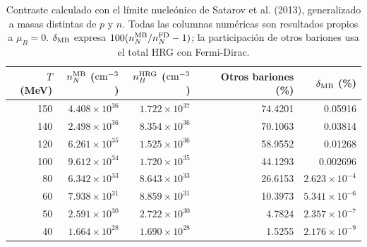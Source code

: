 \begin{table}[t]\centering\small
\caption{Contraste calculado con el límite nucleónico de Satarov et al. (2013), generalizado a masas distintas de $p$ y $n$. Todas las columnas numéricas son resultados propios a $\mu_B=0$. $\delta_{\rm MB}$ expresa $100(n_N^{\rm MB}/n_N^{\rm FD}-1)$; la participación de otros bariones usa el total HRG con Fermi-Dirac.}\label{tab:nucleoncontrast}
\setlength{\tabcolsep}{8pt}\renewcommand{\arraystretch}{1.14}
\begin{tabular}{rrrrr}\toprule
$T$ (MeV) & $n_N^{\rm MB}$ (${\rm cm^{-3}}$) & $n_B^{\rm HRG}$ (${\rm cm^{-3}}$) & Otros bariones (\%) & $\delta_{\rm MB}$ (\%) \\ \midrule
150 & $4.408\times10^{36}$ & $1.722\times10^{37}$ & 74.4201 & 0.05916 \\
140 & $2.498\times10^{36}$ & $8.354\times10^{36}$ & 70.1063 & 0.03814 \\
120 & $6.261\times10^{35}$ & $1.525\times10^{36}$ & 58.9552 & 0.01268 \\
100 & $9.612\times10^{34}$ & $1.720\times10^{35}$ & 44.1293 & 0.002696 \\
80 & $6.342\times10^{33}$ & $8.643\times10^{33}$ & 26.6153 & $2.623\times10^{-4}$ \\
60 & $7.938\times10^{31}$ & $8.859\times10^{31}$ & 10.3973 & $5.341\times10^{-6}$ \\
50 & $2.591\times10^{30}$ & $2.722\times10^{30}$ & 4.7824 & $2.357\times10^{-7}$ \\
40 & $1.664\times10^{28}$ & $1.690\times10^{28}$ & 1.5255 & $2.176\times10^{-9}$ \\
\bottomrule\end{tabular}\end{table}
